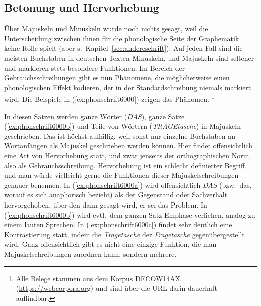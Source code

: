 \subsection{Betonung und Hervorhebung}

\label{sec:hervorhebung}

Über Majuskeln und Minuskeln wurde noch nichts gesagt, weil die Unterscheidung zwischen ihnen für die phonologische Seite der Graphematik keine Rolle spielt (aber s.\ Kapitel~\ref{sec:andereschrift}).
Auf jeden Fall sind die meisten Buchstaben in deutschen Texten Minuskeln, und Majuskeln sind seltener und markieren stets besondere Funktionen.
Im Bereich der Gebrauchsschreibungen gibt es nun Phänomene, die möglicherweise einen phonologischen Effekt kodieren, der in der Standardschreibung niemals markiert wird.
Die Beispiele in (\ref{ex:phonschrift6000}) zeigen das Phänomen.%
\footnote{Alle Belege stammen aus dem Korpus DECOW14AX (\url{https://webcorpora.org}) und sind über die URL darin dauerhaft auffindbar.}

\begin{exe}
  \ex\label{ex:phonschrift6000} 
  \begin{xlist}
  \end{xlist}
\end{exe}

In diesen Sätzen werden ganze Wörter (\textit{DAS}), ganze Sätze (\ref{ex:phonschrift6000b}) und Teile von Wörtern (\textit{TRAGEtasche}) in Majuskeln geschrieben.
Das ist höchst auffällig, weil sonst nur einzelne Buchstaben an Wortanfängen als Majuskel geschrieben werden können.
Hier findet offensichtlich eine Art von Hervorhebung statt, und zwar jenseits der orthographischen Norm, also als Gebrauchsschreibung.
Hervorhebung ist ein schlecht definierter Begriff, und man würde vielleicht gerne die Funktionen dieser Majuskelschreibungen genauer benennen.
In (\ref{ex:phonschrift6000a}) wird offensichtlich \textit{DAS} (bzw.\ das, worauf es sich anaphorisch bezieht) als der Gegenstand oder Sachverhalt hervorgehoben, über den dann gesagt wird, er sei das Problem.
In (\ref{ex:phonschrift6000b}) wird evtl.\ dem ganzen Satz Emphase verliehen, analog zu einem lauten Sprechen.
In (\ref{ex:phonschrift6000c}) findet sehr deutlich eine Kontrastierung statt, indem die \textit{Tragetasche} der \textit{Fragetasche} gegenübergestellt wird.
Ganz offensichtlich gibt es nicht eine einzige Funktion, die man Majuskelschreibungen zuordnen kann, sondern mehrere.

